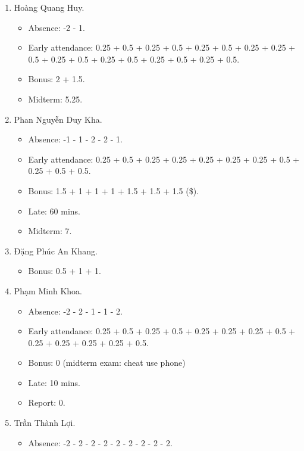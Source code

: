 \documentclass{article}
\begin{document}
\begin{enumerate}
\begin{itemize}
		Ex1.cpp: +0.5, Ex3: +0.5, Ex5.cpp: +1, Ex6.cpp: +1. Ex7.cpp: +1, Ex8.cpp \& Ex9.cpp: +0 (bài toán khó hơn thế vì có thể có nhiều bộ điểm thẳng hàng nên việc mô tả cấu trúc hình học là phần khó chính)
        \item Midterm: 4.
	\end{itemize}
	\item {\sc Hoàng Quang Huy.}
	\begin{itemize}
		\item Absence: -2 - 1.
		\item Early attendance: 0.25 + 0.5 + 0.25 + 0.5 + 0.25 + 0.5 + 0.25 + 0.25 + 0.5 + 0.25 + 0.5 + 0.25 + 0.5 + 0.25 + 0.5 + 0.25 + 0.5.
		\item Bonus: 2 + 1.5.
        \item Midterm: 5.25.
	\end{itemize}
	\item {\sc Phan Nguyễn Duy Kha.}
	\begin{itemize}
		\item Absence: -1 - 1 - 2 - 2 - 1.
		\item Early attendance: 0.25 + 0.5 + 0.25 + 0.25 + 0.25 + 0.25 + 0.25 + 0.5 + 0.25 + 0.5 + 0.5.
		\item Bonus: 1.5 + 1 + 1 + 1 + 1.5 + 1.5 + 1.5 (\$).
		\item Late: 60 mins.
        \item  Midterm: 7.
	\end{itemize}
	\item {\sc Đặng Phúc An Khang.}
	\begin{itemize}
		\item Bonus: 0.5 + 1 + 1.
	\end{itemize}
	\item {\sc Phạm Minh Khoa.}
	\begin{itemize}
		\item Absence: -2 - 2 - 1 - 1 - 2.
		\item Early attendance: 0.25 + 0.5 + 0.25 + 0.5 + 0.25 + 0.25 + 0.25 + 0.5 + 0.25 + 0.25 + 0.25 + 0.25 + 0.5.
		\item Bonus: 0 (midterm exam: cheat use phone)
		\item Late: 10 mins.
        \item Report: 0.
	\end{itemize}
	\item {\sc Trần Thành Lợi.}
	\begin{itemize}
		\item Absence: -2 - 2 - 2 - 2 - 2 - 2 - 2 - 2 - 2.

\end{itemize}
\end{enumerate}
\end{document}
